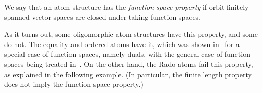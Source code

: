 \begin{definition}\label{def:function-space-property}
    We say that an atom structure has the \emph{function space property} if orbit-finitely spanned vector spaces are closed under taking function spaces.
\end{definition}

As it turns out, some oligomorphic atom structures have this property, and some do not.
The equality and ordered atoms have it,  which was shown in~\cite[Cor. 6.8]{BFKM24} for a special case of function spaces, namely duals, with the  general case of function spaces being treated in~\cite[Sec. 8.3]{bojanczyk_slightly}. 
On the other hand, the Rado atoms fail this property, as explained in the following example. (In particular, the finite length property does not imply the function space property.)

